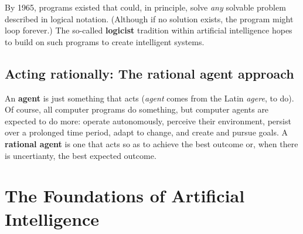\documentclass[a4paper,10pt,twoside]{book}
\begin{document}
By 1965, programs existed that could, in principle, solve \textit{any} solvable problem described in logical notation. (Although if no solution exists, the program might loop forever.) The so-called \textbf{logicist} tradition within artificial intelligence hopes to build on such programs to create intelligent systems.

\subsection{Acting rationally: The rational agent approach}

An \textbf{agent} is just something that acts (\textit{agent} comes from the Latin \textit{agere}, to do). Of course, all computer programs do something, but computer agents are expected to do more: operate autonomously, perceive their environment, persist over a prolonged time period, adapt to change, and create and pursue goals. A \textbf{rational agent} is one that acts so as to achieve the best outcome or, when there is uncertianty, the best expected outcome.

\section{The Foundations of Artificial Intelligence}

\end{document}
